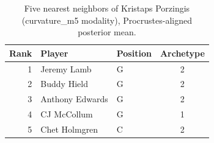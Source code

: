 \begin{table}[htbp]
  \centering\small
  \begin{tabular}{rllc}
    \toprule
    Rank & Player & Position & Archetype \\
    \midrule
    1 & Jeremy Lamb & G & 2 \\
    2 & Buddy Hield & G & 2 \\
    3 & Anthony Edwards & G & 2 \\
    4 & CJ McCollum & G & 1 \\
    5 & Chet Holmgren & C & 2 \\
    \bottomrule
  \end{tabular}
  \caption{Five nearest neighbors of Kristaps Porzingis (curvature_m5 modality), Procrustes-aligned posterior mean.}
  \label{tab:Kristaps_Porzingis_neighbors_curvature_m5}
\end{table}

